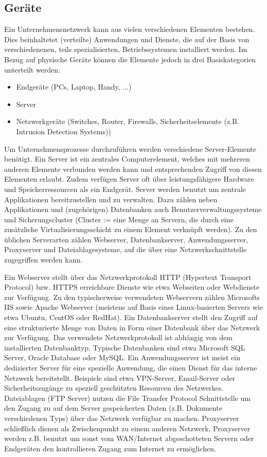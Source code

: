\subsection{Geräte}
Ein Unternehmensnetzwerk kann aus vielen verschiedenen Elementen bestehen. Dies beinhaltetet (verteilte) Anwendungen und Dienste, die auf der Basis von verschiedenenen, teils spezialisierten, Betriebssystemen installiert werden. Im Bezug auf physische Geräte können die Elemente jedoch in drei Basiskategorien unterteilt werden:
\begin{itemize}
\item Endgeräte (PCs, Laptop, Handy, ...)
\item Server
\item Netzwerkgeräte (Switches, Router, Firewalls, Sicherheitselemente (z.B. Intrusion Detection Systems))
\end{itemize}

Um Unternehmensprozesse durchzuführen werden verschiedene Server-Elemente benötigt. Ein Server ist ein zentrales Computerelement, welches mit mehreren anderen Elemente verbunden werden kann und entsprechenden Zugriff von diesen Elementen erlaubt. Zudem verfügen Server oft über leistungsfähigere Hardware und Speicherressourcen als ein Endgerät. Server werden benutzt um zentrale Applikationen bereitzustellen und zu verwalten. Dazu zählen neben Applikationen und (zugehörigen) Datenbanken auch Benutzerverwaltungssysteme und Sicherungscluster (Cluster := eine Menge an Servern, die durch eine zusätzliche Virtualisierungsschicht zu einem Element verknüpft werden). Zu den üblichen Serverarten zählen Webserver, Datenbankserver, Anwendungsserver, Proxyserver und Dateiablagesysteme, auf die über eine Netzwerkschnittstelle zugegriffen werden kann. 

Ein Webserver stellt über das Netzwerkprotokoll HTTP (Hypertext Transport Protocol) bzw. HTTPS erreichbare Dienste wie etwa Webseiten oder Webdienste zur Verfügung. Zu den typischerweise verwendeten Webservern zählen Microsofts IIS sowie Apache Webserver (meistens auf Basis eines Linux-basierten Servers wie etwa Ubuntu, CentOS oder RedHat). 
Ein Datenbankserver stellt den Zugriff auf eine strukturierte Menge von Daten in Form einer Datenbank über das Netzwerk zur Verfügung. Das verwendete Netzwerkprotokoll ist abhängig von dem installierten Datenbanktyp. Typische Datenbanken sind etwa Microsoft SQL Server, Oracle Database oder MySQL. 
Ein Anwendungsserver ist meist ein dedizierter Server für eine spezielle Anwendung, die einen Dienst für das interne Netzwerk bereitstellt. Beispiele sind etwa VPN-Server, Email-Server oder Sicherheitszugänge zu speziell geschützten Resourcen des Netzwerkes.
Dateiablagen (FTP Server) nutzen die File Transfer Protocol Schnittstelle um den Zugang zu auf dem Server gespeicherten Daten (z.B. Dokumente verschiedenen Typs) über das Netzwerk verfügbar zu machen. 
Proxyserver schließlich dienen als Zwischenpunkt zu einem anderen Netzwerk. Proxyserver werden z.B. benutzt um sonst vom WAN/Internet abgeschotteten Servern oder Endgeräten den kontrollieren Zugang zum Internet zu ermöglichen. 

